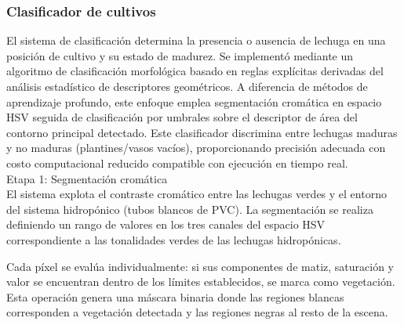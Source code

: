 \subsubsection{Clasificador de cultivos}

El sistema de clasificación determina la presencia o ausencia de lechuga en una posición de cultivo y su estado de madurez. Se implementó mediante un algoritmo de clasificación morfológica basado en reglas explícitas derivadas del análisis estadístico de descriptores geométricos. A diferencia de métodos de aprendizaje profundo, este enfoque emplea segmentación cromática en espacio HSV seguida de clasificación por umbrales sobre el descriptor de área del contorno principal detectado. Este clasificador discrimina entre lechugas maduras y no maduras (plantines/vasos vacíos), proporcionando precisión adecuada con costo computacional reducido compatible con ejecución en tiempo real.\\

Etapa 1: Segmentación cromática\\
\noindent
El sistema explota el contraste cromático entre las lechugas verdes y el entorno del sistema hidropónico (tubos blancos de PVC). La segmentación se realiza definiendo un rango de valores en los tres canales del espacio HSV correspondiente a las tonalidades verdes de las lechugas hidropónicas.

Cada píxel se evalúa individualmente: si sus componentes de matiz, saturación y valor se encuentran dentro de los límites establecidos, se marca como vegetación. Esta operación genera una máscara binaria donde las regiones blancas corresponden a vegetación detectada y las regiones negras al resto de la escena.

